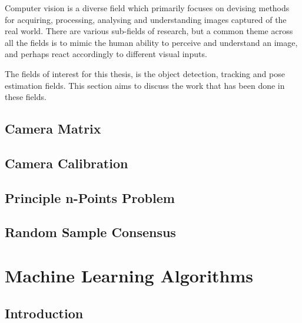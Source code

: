 Computer vision is a diverse field which primarily focuses on devising methods for acquiring, processing, analysing and understanding images captured of the real world. There are various sub-fields of research, but a common theme across all the fields is to mimic the human ability to perceive and understand an image, and perhaps react accordingly to different visual inputs. 

The fields of interest for this thesis, is the object detection, tracking and pose estimation fields. This section aims to discuss the work that has been done in these fields. 

\subsection{Camera Matrix}

\subsection{Camera Calibration}

\subsection{Principle n-Points Problem}

\subsection{Random Sample Consensus}

\section{Machine Learning Algorithms}

\subsection{Introduction}

